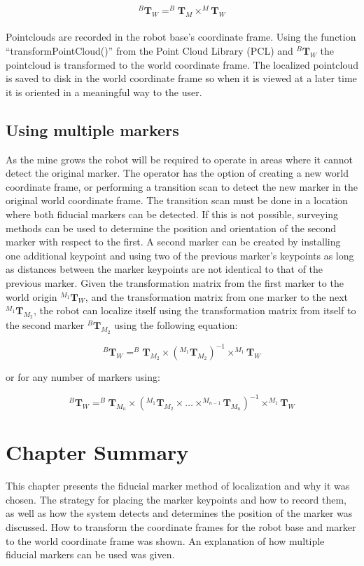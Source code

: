 \begin{equation}
    ^{B}\mathbf{T}_{W} = ^{B}\mathbf{T}_{M}\times^{M}\mathbf{T}_{W}
\end{equation}\\

Pointclouds are recorded in the robot base's coordinate frame. Using the function ``transformPointCloud()'' from the Point Cloud Library (PCL) and $^{B}\mathbf{T}_{W}$ the pointcloud is transformed to the world coordinate frame. The localized pointcloud is saved to disk in the world coordinate frame so when it is viewed at a later time it is oriented in a meaningful way to the user.\\

\subsection{Using multiple markers}

As the mine grows the robot will be required to operate in areas where it cannot detect the original marker. The operator has the option of creating a new world coordinate frame, or performing a transition scan to detect the new marker in the original world coordinate frame. The transition scan must be done in a location where both fiducial markers can be detected. If this is not possible, surveying methods can be used to determine the position and orientation of the second marker with respect to the first. A second marker can be created by installing one additional keypoint and using two of the previous marker's keypoints as long as distances between the marker keypoints are not identical to that of the previous marker. Given the transformation matrix from the first marker to the world origin $^{M_1}\mathbf{T}_{W}$, and the transformation matrix from one marker to the next $^{M_1}\mathbf{T}_{M_2}$, the robot can localize itself using the transformation matrix from itself to the second marker $^{B}\mathbf{T}_{M_2}$ using the following equation:

\begin{equation}
    ^{B}\mathbf{T}_{W} = ^{B}\mathbf{T}_{M_2}\times(^{M_1}\mathbf{T}_{M_2})^{-1}\times^{M_1}\mathbf{T}_{W}
\end{equation}

or for any number of markers using:

\begin{equation}
    ^{B}\mathbf{T}_{W} = ^{B}\mathbf{T}_{M_n}\times(^{M_1}\mathbf{T}_{M_2}\times\hdots\times^{M_{n-1}}\mathbf{T}_{M_n})^{-1}\times^{M_1}\mathbf{T}_{W}
\end{equation}

\section{Chapter Summary}
This chapter presents the fiducial marker method of localization and why it was chosen. The strategy for placing the marker keypoints and how to record them, as well as how the system detects and determines the position of the marker was discussed. How to transform the coordinate frames for the robot base and marker to the world coordinate frame was shown. An explanation of how multiple fiducial markers can be used was given.\\